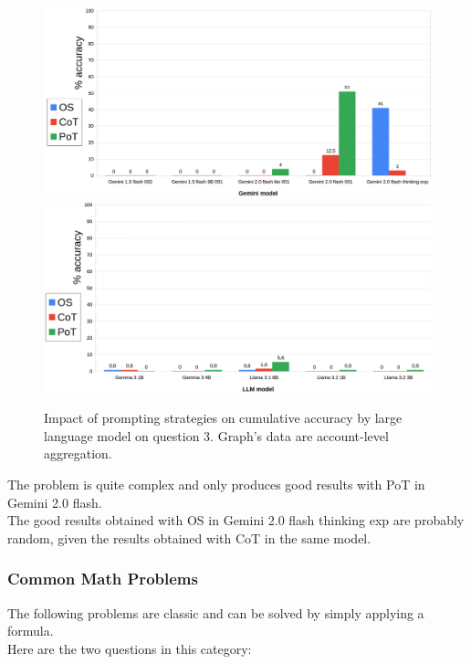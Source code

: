 \documentclass[12pt]{article}
\begin{document}
\begin{figure}[H]
    \centering
            \includegraphics[width=1\textwidth]{q105Gemini.png}
            \includegraphics[width=1\textwidth]{q105Other.png}
    \caption[Accuracy on Question 3 by LLM]{Impact of prompting strategies on cumulative accuracy by large language model on question 3. Graph's data are account-level aggregation.}
    \label{fig:28}
    \end{figure} 
The problem is quite complex and only produces good results with PoT in Gemini 2.0 flash.\\ 
The good results obtained with OS in Gemini 2.0 flash thinking exp are probably random, given the results obtained with CoT in the same model.\\

\vspace{2cm}

\subsubsection{Common Math Problems} %
The following problems are classic and can be solved by simply applying a formula.\\
Here are the two questions in this category:\\
\end{document}
